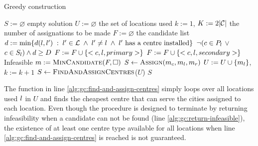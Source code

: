 \begin{algorithm}[H]
    \label{alg:greedy-construct}
    \DontPrintSemicolon
    
    \caption{Greedy construction}
    
     {
        $S := \varnothing$ empty solution \;
        $U := \varnothing$ the set of locations used \;
        $k := 1$, $K := 2|\mathcal{C}|$ the number of assignations to be made\;
         {
            $F := \varnothing$ the candidate list\;
            \For {$<\icity, \iloc> \; : \; \icity \in \city, \; \iloc \in \loc$} {
                $d := \text{min}
                    \{
                    d(l, l') \; : \;
                        l' \in \mathcal{L} \; \wedge \; 
                        l' \neq l \; \wedge \; 
                        l' \text{ has a centre installed}
                    \}
                $\;
                \If
                {$\neg (c \in P_l$ $\vee$ $c \in S_l) \wedge d \ge D$}
                {
                     {
                        $F := F \cup \{<c, l, primary>\}$
                    }
                     {
                        $F := F \cup \{<c, l, secondary>\}$
                    }
                }
            }
             {
                \Return Infeasible\label{alg:gc:return-infeasible}
            }
            $m := \textsc{MinCandidate}(F, \Box)$\;
            $S \leftarrow \textsc{Assign}(m_c, m_l, m_r)$\;
            $U := U \cup \{ m_l \}$, $k := k + 1$\;
        }
        $S\leftarrow\textsc{FindAndAssignCentres}$($U$)
            \label{alg:gc:find-and-assign-centres}\;
        \Return $S$\;
    }
\end{algorithm}

\hfill

The function in line \ref{alg:gc:find-and-assign-centres} simply loops over all locations
used $l$ in $U$ and finds the cheapest centre that can serve the cities assigned to each
location. Even though the procedure is designed to terminate by returning infeasibility when
a candidate can not be found (line \ref{alg:gc:return-infeasible}), the existence of at least
one centre type available for all locations when line \ref{alg:gc:find-and-assign-centres} is
reached is not guaranteed.

